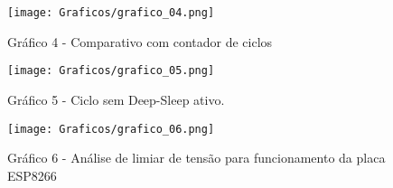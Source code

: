 \begin{figure}[htp]
    \centering
    \texttt{[image: Graficos/grafico\_04.png]}
    \caption{Gráfico 4 - Comparativo com contador de ciclos}
    \label{fig:grafico_results_04}
\end{figure}

\begin{figure}[htp]
    \centering
    \texttt{[image: Graficos/grafico\_05.png]}
    \caption{Gráfico 5 - Ciclo sem Deep-Sleep ativo.}
    \label{fig:grafico_results_05}
\end{figure}

\begin{figure}[htp]
    \centering
    \texttt{[image: Graficos/grafico\_06.png]}
    \caption{Gráfico 6 - Análise de limiar de tensão para funcionamento da placa ESP8266}
    \label{fig:grafico_results_06}
\end{figure}

